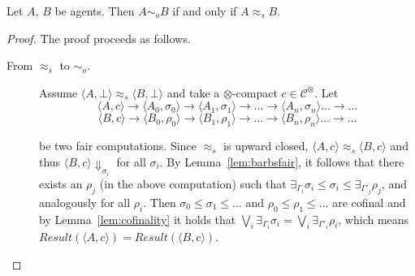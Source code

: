 \documentclass{llncs}
\begin{document}
\begin{theorem}\label{prop:weaksbequivobs}
Let $A$, $B$ be agents. Then $A \sim_o B$ if and only if $A \approx_{\mathit{s}} B$.
\end{theorem}
\begin{proof}%
	The proof proceeds as follows.
	\begin{description}
		\item[From $\approx_{\mathit{s}}$ to $\sim_o$.] Assume  $\langle A, \bot \rangle \approx_{\mathit{s}} \langle B, \bot \rangle$ and take a $\otimes$-compact $c \in \mathcal{C}^\otimes$. Let
		\begin{equation}\label{comp:1}\langle A, c \rangle \longrightarrow \langle A_0, \sigma_0 \rangle \longrightarrow \langle A_1, \sigma_1 \rangle \longrightarrow \dots \longrightarrow \langle A_n, \sigma_n \rangle \dots \longrightarrow \dots
		\end{equation}
		\begin{equation}\label{comp:2}\langle B, c \rangle \longrightarrow \langle B_0, \rho_0 \rangle \longrightarrow \langle B_1, \rho_1 \rangle \longrightarrow \dots \longrightarrow \langle B_n, \rho_n \rangle \dots \longrightarrow \dots
		\end{equation}
		
		be two fair computations. Since $\approx_{\mathit{s}}$ is upward closed, 
		$\langle A, c \rangle \approx_{\mathit{s}} \langle B, c \rangle$ and thus $\langle B, c\rangle \Downarrow_{\sigma_i}$ for all $\sigma_i$. By Lemma~\ref{lem:barbsfair}, it follows that there exists an $\rho_j$ (in the above computation) such that 
		$\exists_{\Gamma_i} \sigma_i \leq \sigma_i \leq \exists_{\Gamma'_j} \rho_j$, and analogously for all $\rho_i$.
		Then $\sigma_0 \leq \sigma_1 \leq \dots$  and $\rho_0 \leq \rho_1 \leq \dots$ are cofinal and by Lemma~\ref{lem:cofinality} it holds that $\bigvee_i \exists_{\Gamma_i} \sigma_i = \bigvee_i \exists_{\Gamma'_i} \rho_i$, which means 
		$\mathit{Result}(\langle A, c \rangle) = \mathit{Result}(\langle B, c \rangle)$.
		

\end{description}
\end{proof}
\end{document}
